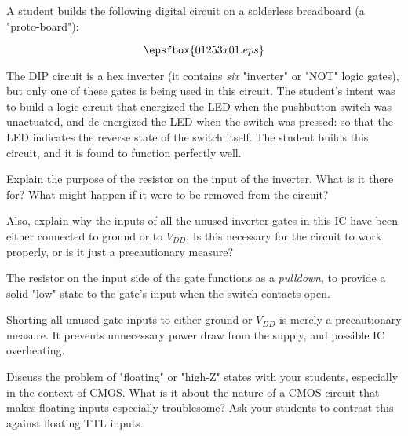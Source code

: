 

A student builds the following digital circuit on a solderless breadboard (a "proto-board"):

$$\epsfbox{01253x01.eps}$$

The DIP circuit is a hex inverter (it contains {\it six} "inverter" or "NOT" logic gates), but only one of these gates is being used in this circuit.  The student's intent was to build a logic circuit that energized the LED when the pushbutton switch was unactuated, and de-energized the LED when the switch was pressed: so that the LED indicates the reverse state of the switch itself.  The student builds this circuit, and it is found to function perfectly well.

Explain the purpose of the resistor on the input of the inverter.  What is it there for?  What might happen if it were to be removed from the circuit?

Also, explain why the inputs of all the unused inverter gates in this IC have been either connected to ground or to $V_{DD}$.  Is this necessary for the circuit to work properly, or is it just a precautionary measure?







The resistor on the input side of the gate functions as a {\it pulldown}, to provide a solid "low" state to the gate's input when the switch contacts open.

Shorting all unused gate inputs to either ground or $V_{DD}$ is merely a precautionary measure.  It prevents unnecessary power draw from the supply, and possible IC overheating.







Discuss the problem of "floating" or "high-Z" states with your students, especially in the context of CMOS.  What is it about the nature of a CMOS circuit that makes floating inputs especially troublesome?  Ask your students to contrast this against floating TTL inputs.




